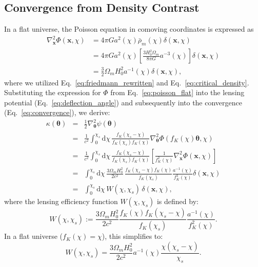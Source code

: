 \subsection{Convergence from Density Contrast}
In a flat universe, the Poisson equation in comoving coordinates is expressed as
\begin{align}
\label{eq:poisson_flat}
    \nabla_{\mathbf{x}}^2 \Phi(\mathbf{x}, \chi) &= 4\pi G a^2(\chi) \bar{\rho}_m(\chi) \delta(\mathbf{x}, \chi) \nonumber\\ 
    &= 4\pi G a^2(\chi) \left[ \frac{3 H_0^2 \Omega_m}{8 \pi G} a^{-3}(\chi) \right] \delta(\mathbf{x}, \chi) \nonumber \\ 
    &= \frac{3}{2} \Omega_m H_0^2 a^{-1}(\chi) \delta(\mathbf{x}, \chi),
\end{align}
where we utilized Eq.~\eqref{eq:friedmann_rewritten} and Eq.~\eqref{eq:critical_density}.
Substituting the expression for $\Phi$ from Eq.~\eqref{eq:poisson_flat} into the lensing potential (Eq.~\eqref{eq:deflection_angle}) and subsequently into the convergence (Eq.~\eqref{eq:convergence}), we derive:
\begin{eqnarray}
    \label{eq:convergence_integral}
    \kappa(\boldsymbol{\theta}) 
    &=& \frac{1}{2} \nabla_{\boldsymbol{\theta}}^2 \psi(\boldsymbol{\theta}) \nonumber \\
    &=& \frac{1}{c^2} \int_0^{\chi_s} \mathrm{d}\chi \, \frac{f_K(\chi_s - \chi)}{f_K(\chi_s) f_K(\chi)} \nabla_{\boldsymbol{\theta}}^2 \Phi\left(f_K(\chi) \boldsymbol{\theta}, \chi\right) \nonumber \\
    &=& \frac{1}{c^2} \int_0^{\chi_s} \mathrm{d}\chi \, \frac{f_K(\chi_s - \chi)}{f_K(\chi_s) f_K(\chi)} \left[ \frac{1}{f_K^2(\chi)} \nabla_{\mathbf{x}}^2 \Phi\left(\mathbf{x}, \chi\right) \right] \nonumber \\
    &=& \int_0^{\chi_s} \mathrm{d}\chi \, \frac{3 \Omega_m H_0^2}{2 c^2} \, \frac{f_K(\chi_s - \chi) f_K(\chi)}{f_K(\chi_s)} \frac{a^{-1}(\chi)}{f_K^3(\chi)} \delta\left(\mathbf{x}, \chi\right) \nonumber \\
    &=& \int_0^{\chi_s} \mathrm{d}\chi \, W(\chi, \chi_s) \, \delta\left(\mathbf{x}, \chi\right),
\end{eqnarray}
where the lensing efficiency function $W(\chi, \chi_s)$ is defined by:
\begin{equation}
    \label{eq:lensing_efficiency}
    W(\chi, \chi_s) := \frac{3 \Omega_m H_0^2}{2 c^2} \frac{f_K(\chi) f_K(\chi_s - \chi)}{f_K(\chi_s)} \frac{a^{-1}(\chi)}{f_K^2(\chi)}.
\end{equation}
In a flat universe ($f_K(\chi) = \chi$), this simplifies to:
\begin{equation}
    \label{eq:lensing_efficiency_flat}
    W(\chi, \chi_s) = \frac{3 \Omega_m H_0^2}{2 c^2} a^{-1}(\chi) \frac{\chi (\chi_s - \chi)}{\chi_s}.
\end{equation}

